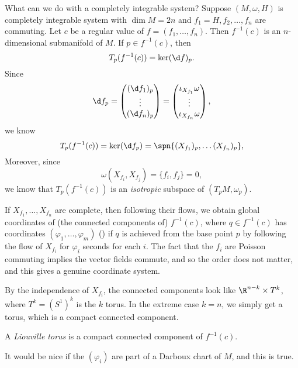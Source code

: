 \documentclass[a4paper]{article}
\begin{document}
What can we do with a completely integrable system? Suppose $(M, \omega, H)$ is completely integrable system with $\dim M = 2n$ and $f_1 = H, f_2, \ldots, f_n$ are commuting. Let $c$ be a regular value of $f = (f_1, \ldots, f_n)$. Then $f^{-1}(c)$ is an $n$-dimensional submanifold of $M$. If $p \in f^{-1}(c)$, then
\[
  T_p(f^{-1}(c)) = \ker (\d f)_p.
\]
Since
\[
  \d f_p =
  \begin{pmatrix}
    (\d f_1)_p\\
    \vdots\\
    (\d f_n)_p
  \end{pmatrix}
  =
  \begin{pmatrix}
    \iota_{X_{f_1}} \omega\\\vdots \\\iota_{X_{f_n}}\omega
  \end{pmatrix},
\]
we know
\[
  T_p (f^{-1}(c)) = \ker (\d f_p) = \spn \{(X_{f_1})_p, \ldots (X_{f_n})_p\},
\]
Moreover, since
\[
  \omega(X_{f_i}, X_{f_j}) = \{f_i, f_j\} = 0,
\]
we know that $T_p (f^{-1}(c))$ is an \emph{isotropic} subspace of $(T_p M, \omega_p)$.

If $X_{f_1}, \ldots, X_{f_n}$ are complete, then following their flows, we obtain global coordinates of (the connected components of) $f^{-1}(c)$, where $q \in f^{-1}(c)$ has coordinates $(\varphi_1, \ldots, \varphi_m)$ () if $q$ is achieved from the base point $p$ by following the flow of $X_{f_i}$ for $\varphi_i$ seconds for each $i$. The fact that the $f_i$ are Poisson commuting implies the vector fields commute, and so the order does not matter, and this gives a genuine coordinate system.

By the independence of $X_{f_i}$, the connected components look like $\R^{n - k} \times T^k$, where $T^k = (S^1)^k$ is the $k$ torus. In the extreme case $k = n$, we simply get a torus, which is a compact connected component.

\begin{defi}
  A \emph{Liouville torus} is a compact connected component of $f^{-1}(c)$.
\end{defi}

It would be nice if the $(\varphi_i)$ are part of a Darboux chart of $M$, and this is true.
\end{document}
